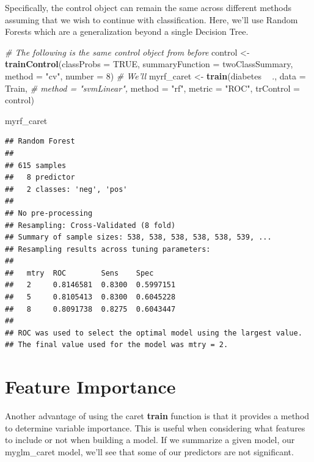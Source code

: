 \documentclass[
]{book}
\newenvironment{Shaded}{\begin{snugshade}}{\end{snugshade}}
\newcommand{\CommentTok}[1]{\textcolor[rgb]{0.56,0.35,0.01}{\textit{#1}}}
\newcommand{\DataTypeTok}[1]{\textcolor[rgb]{0.13,0.29,0.53}{#1}}
\newcommand{\DecValTok}[1]{\textcolor[rgb]{0.00,0.00,0.81}{#1}}
\newcommand{\KeywordTok}[1]{\textcolor[rgb]{0.13,0.29,0.53}{\textbf{#1}}}
\newcommand{\NormalTok}[1]{#1}
\newcommand{\OperatorTok}[1]{\textcolor[rgb]{0.81,0.36,0.00}{\textbf{#1}}}
\newcommand{\OtherTok}[1]{\textcolor[rgb]{0.56,0.35,0.01}{#1}}
\newcommand{\StringTok}[1]{\textcolor[rgb]{0.31,0.60,0.02}{#1}}
\begin{document}
Specifically, the control object can remain the same across different methods assuming that we wish to continue with classification. Here, we'll use Random Forests which are a generalization beyond a single Decision Tree.

\begin{Shaded}
\begin{Highlighting}[]
\CommentTok{# The following is the same control object from before}
\NormalTok{control <-}\StringTok{ }\KeywordTok{trainControl}\NormalTok{(}\DataTypeTok{classProbs =} \OtherTok{TRUE}\NormalTok{,}
                        \DataTypeTok{summaryFunction =}\NormalTok{ twoClassSummary,}
                        \DataTypeTok{method =} \StringTok{"cv"}\NormalTok{,}
                        \DataTypeTok{number =} \DecValTok{8}\NormalTok{)}
\CommentTok{# We'll }
\NormalTok{myrf_caret <-}\StringTok{ }\KeywordTok{train}\NormalTok{(diabetes }\OperatorTok{~}\StringTok{ }\NormalTok{.,}
               \DataTypeTok{data =}\NormalTok{ Train,}
 \CommentTok{#              method = "svmLinear",}
               \DataTypeTok{method =} \StringTok{"rf"}\NormalTok{,}
               \DataTypeTok{metric =} \StringTok{"ROC"}\NormalTok{,}
               \DataTypeTok{trControl =}\NormalTok{ control)}

\NormalTok{myrf_caret}
\end{Highlighting}
\end{Shaded}

\begin{verbatim}
## Random Forest 
## 
## 615 samples
##   8 predictor
##   2 classes: 'neg', 'pos' 
## 
## No pre-processing
## Resampling: Cross-Validated (8 fold) 
## Summary of sample sizes: 538, 538, 538, 538, 538, 539, ... 
## Resampling results across tuning parameters:
## 
##   mtry  ROC        Sens    Spec     
##   2     0.8146581  0.8300  0.5997151
##   5     0.8105413  0.8300  0.6045228
##   8     0.8091738  0.8275  0.6043447
## 
## ROC was used to select the optimal model using the largest value.
## The final value used for the model was mtry = 2.
\end{verbatim}

\hypertarget{feature-importance}{%
\chapter{Feature Importance}\label{feature-importance}}

Another advantage of using the caret \textbf{train} function is that it provides a method to determine variable importance. This is useful when considering what features to include or not when building a model. If we summarize a given model, our myglm\_caret model, we'll see that some of our predictors are not significant.
\end{document}
